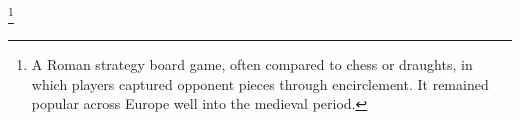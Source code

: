 \footnote{A Roman strategy board game, often compared to chess or draughts, in which players captured opponent pieces through encirclement. It remained popular across Europe well into the medieval period.}